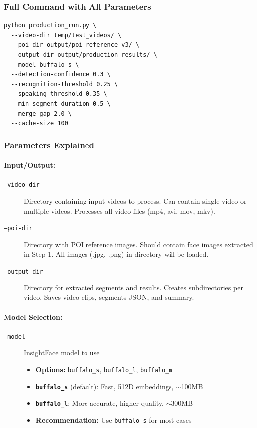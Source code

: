 \documentclass[11pt,a4paper]{article}
\begin{document}
\subsubsection{Full Command with All Parameters}
\begin{lstlisting}[style=bashcode]
python production_run.py \
  --video-dir temp/test_videos/ \
  --poi-dir output/poi_reference_v3/ \
  --output-dir output/production_results/ \
  --model buffalo_s \
  --detection-confidence 0.3 \
  --recognition-threshold 0.25 \
  --speaking-threshold 0.35 \
  --min-segment-duration 0.5 \
  --merge-gap 2.0 \
  --cache-size 100
\end{lstlisting}

\subsubsection{Parameters Explained}

\paragraph{Input/Output:}

\begin{description}
    \item[\texttt{--video-dir}] Directory containing input videos to process. Can contain single video or multiple videos. Processes all video files (mp4, avi, mov, mkv).
    
    \item[\texttt{--poi-dir}] Directory with POI reference images. Should contain face images extracted in Step 1. All images (.jpg, .png) in directory will be loaded.
    
    \item[\texttt{--output-dir}] Directory for extracted segments and results. Creates subdirectories per video. Saves video clips, segments JSON, and summary.
\end{description}

\paragraph{Model Selection:}

\begin{description}
    \item[\texttt{--model}] InsightFace model to use
    \begin{itemize}
        \item \textbf{Options:} \texttt{buffalo\_s}, \texttt{buffalo\_l}, \texttt{buffalo\_m}
        \item \textbf{\texttt{buffalo\_s}} (default): Fast, 512D embeddings, $\sim$100MB
        \item \textbf{\texttt{buffalo\_l}}: More accurate, higher quality, $\sim$300MB
        \item \textbf{Recommendation:} Use \texttt{buffalo\_s} for most cases
    \end{itemize}
\end{description}
\end{document}
